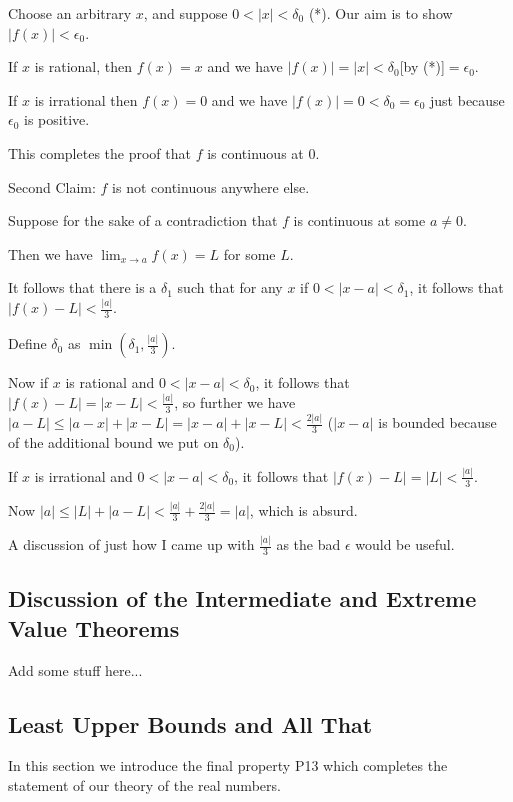 \documentclass[12pt]{article}
\begin{document}
Choose an arbitrary $x$, and suppose $0<|x|<\delta_0$ (*).  Our aim is to show $|f(x)|<\epsilon_0$.

If $x$ is rational, then $f(x)=x$ and we have $|f(x)|=|x|<\delta_0$[by (*)]$=\epsilon_0$.

If $x$ is irrational then $f(x)=0$ and we have $|f(x)|=0<\delta_0=\epsilon_0$ just because $\epsilon_0$ is positive.

This completes the proof that $f$ is continuous at 0.

Second Claim:  $f$ is not continuous anywhere else.

Suppose for the sake of a contradiction that $f$ is continuous at some $a \neq 0$.

Then we have $\lim_{x \rightarrow a}f(x)=L$ for some $L$.

It follows that there is a $\delta_1$ such that for any $x$ if $0<|x-a|<\delta_1$, it follows that $|f(x)-L|<\frac{|a|}3$.

Define $\delta_0$ as $\min(\delta_1,\frac{|a|}3)$.

Now if $x$ is rational and $0<|x-a|<\delta_0$, it follows that $|f(x)-L|=|x-L|<\frac{|a|}3$, so further we have $|a-L| \leq |a-x|+|x-L| = |x-a|+|x-L|<\frac{2|a|}3$  ($|x-a|$ is bounded because of the additional bound we put on $\delta_0$).

If $x$ is irrational and $0<|x-a|<\delta_0$, it follows that $|f(x)-L|=|L|<\frac{|a|}3$.

Now $|a| \leq |L|+|a-L| < \frac{|a|}3+\frac{2|a|}3=|a|$, which is absurd.

A discussion of just how I came up with $\frac{|a|}3$ as the bad $\epsilon$ would be useful.

\subsection{Discussion of the Intermediate and Extreme Value Theorems}

Add some stuff here...

\subsection{Least Upper Bounds and All That}

In this section we introduce the final property P13 which completes the statement of our theory of the real numbers.
\end{document}
